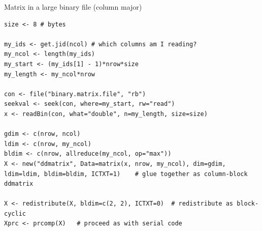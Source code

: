 \begin{frame}[fragile]
  \begin{exampleblock}{Matrix in a large binary file (column major)}\pause \vspace{-0.8ex}
    \begin{lstlisting}[title=Parallel Code]
size <- 8 # bytes

my_ids <- get.jid(ncol) # which columns am I reading?
my_ncol <- length(my_ids)
my_start <- (my_ids[1] - 1)*nrow*size
my_length <- my_ncol*nrow

con <- file("binary.matrix.file", "rb")
seekval <- seek(con, where=my_start, rw="read")
x <- readBin(con, what="double", n=my_length, size=size)

gdim <- c(nrow, ncol)
ldim <- c(nrow, my_ncol)
bldim <- c(nrow, allreduce(my_ncol, op="max"))
X <- new("ddmatrix", Data=matrix(x, nrow, my_ncol), dim=gdim, ldim=ldim, bldim=bldim, ICTXT=1)    # glue together as column-block ddmatrix

X <- redistribute(X, bldim=c(2, 2), ICTXT=0)  # redistribute as block-cyclic
Xprc <- prcomp(X)   # proceed as with serial code
    \end{lstlisting}
  \end{exampleblock}
\end{frame}
